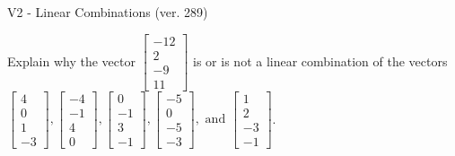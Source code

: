 \begin{exercise}
  \begin{exerciseTitle}V2 - Linear Combinations (ver. 289)\end{exerciseTitle}
  \begin{exerciseStatement}
    Explain why the vector \(\left[\begin{array}{c}
-12 \\
2 \\
-9 \\
11
\end{array}\right]\)  is or is not a linear 
	combination of the vectors \(\left[\begin{array}{c}
4 \\
0 \\
1 \\
-3
\end{array}\right] , \left[\begin{array}{c}
-4 \\
-1 \\
4 \\
0
\end{array}\right] , \left[\begin{array}{c}
0 \\
-1 \\
3 \\
-1
\end{array}\right] , \left[\begin{array}{c}
-5 \\
0 \\
-5 \\
-3
\end{array}\right] , \text{ and } \left[\begin{array}{c}
1 \\
2 \\
-3 \\
-1
\end{array}\right]\).
	



\end{exerciseStatement}
\end{exercise}
